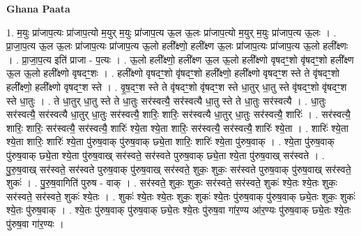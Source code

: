 \documentclass[17pt]{extarticle}
\begin{document}
\textbf{Ghana Paata } \newline

1. म॒युः प्रा॑जाप॒त्यः प्रा॑जाप॒त्यो म॒युर् म॒युः प्रा॑जाप॒त्य ऊ॒ल ऊ॒लः प्रा॑जाप॒त्यो म॒युर् म॒युः प्रा॑जाप॒त्य ऊ॒लः । . प्रा॒जा॒प॒त्य ऊ॒ल ऊ॒लः प्रा॑जाप॒त्यः प्रा॑जाप॒त्य ऊ॒लो हली᳚क्ष्णो॒ हली᳚क्ष्ण ऊ॒लः प्रा॑जाप॒त्यः प्रा॑जाप॒त्य ऊ॒लो हली᳚क्ष्णः । . प्रा॒जा॒प॒त्य इति॑ प्राजा - प॒त्यः । . ऊ॒लो हली᳚क्ष्णो॒ हली᳚क्ष्ण ऊ॒ल ऊ॒लो हली᳚क्ष्णो वृषदꣳ॒॒शो वृ॑षदꣳ॒॒शो हली᳚क्ष्ण ऊ॒ल ऊ॒लो हली᳚क्ष्णो वृषदꣳ॒॒शः । . हली᳚क्ष्णो वृषदꣳ॒॒शो वृ॑षदꣳ॒॒शो हली᳚क्ष्णो॒ हली᳚क्ष्णो वृषदꣳ॒॒श स्ते ते वृ॑षदꣳ॒॒शो हली᳚क्ष्णो॒ हली᳚क्ष्णो वृषदꣳ॒॒श स्ते । . वृ॒ष॒दꣳ॒॒श स्ते ते वृ॑षदꣳ॒॒शो वृ॑षदꣳ॒॒श स्ते धा॒तुर् धा॒तु स्ते वृ॑षदꣳ॒॒शो वृ॑षदꣳ॒॒श स्ते धा॒तुः । . ते धा॒तुर् धा॒तु स्ते ते धा॒तुः सर॑स्वत्यै॒ सर॑स्वत्यै धा॒तु स्ते ते धा॒तुः सर॑स्वत्यै । . धा॒तुः सर॑स्वत्यै॒ सर॑स्वत्यै धा॒तुर् धा॒तुः सर॑स्वत्यै॒ शारिः॒ शारिः॒ सर॑स्वत्यै धा॒तुर् धा॒तुः सर॑स्वत्यै॒ शारिः॑ । . सर॑स्वत्यै॒ शारिः॒ शारिः॒ सर॑स्वत्यै॒ सर॑स्वत्यै॒ शारिः॑ श्ये॒ता श्ये॒ता शारिः॒ सर॑स्वत्यै॒ सर॑स्वत्यै॒ शारिः॑ श्ये॒ता । . शारिः॑ श्ये॒ता श्ये॒ता शारिः॒ शारिः॑ श्ये॒ता पु॑रुष॒वाक् पु॑रुष॒वाक् छ्ये॒ता शारिः॒ शारिः॑ श्ये॒ता पु॑रुष॒वाक् । . श्ये॒ता पु॑रुष॒वाक् पु॑रुष॒वाक् छ्ये॒ता श्ये॒ता पु॑रुष॒वाख् सर॑स्वते॒ सर॑स्वते पुरुष॒वाक् छ्ये॒ता श्ये॒ता पु॑रुष॒वाख् सर॑स्वते । . पु॒रु॒ष॒वाख् सर॑स्वते॒ सर॑स्वते पुरुष॒वाक् पु॑रुष॒वाख् सर॑स्वते॒ शुकः॒ शुकः॒ सर॑स्वते पुरुष॒वाक् पु॑रुष॒वाख् सर॑स्वते॒ शुकः॑ । . पु॒रु॒ष॒वागिति॑ पुरुष - वाक् । . सर॑स्वते॒ शुकः॒ शुकः॒ सर॑स्वते॒ सर॑स्वते॒ शुकः॑ श्ये॒तः श्ये॒तः शुकः॒ सर॑स्वते॒ सर॑स्वते॒ शुकः॑ श्ये॒तः । . शुकः॑ श्ये॒तः श्ये॒तः शुकः॒ शुकः॑ श्ये॒तः पु॑रुष॒वाक् पु॑रुष॒वाक् छ्ये॒तः शुकः॒ शुकः॑ श्ये॒तः पु॑रुष॒वाक् । . श्ये॒तः पु॑रुष॒वाक् पु॑रुष॒वाक् छ्ये॒तः श्ये॒तः पु॑रुष॒वा गा॑र॒ण्य आ॑र॒ण्यः पु॑रुष॒वाक् छ्ये॒तः श्ये॒तः पु॑रुष॒वा गा॑र॒ण्यः । \newline
\end{document}
